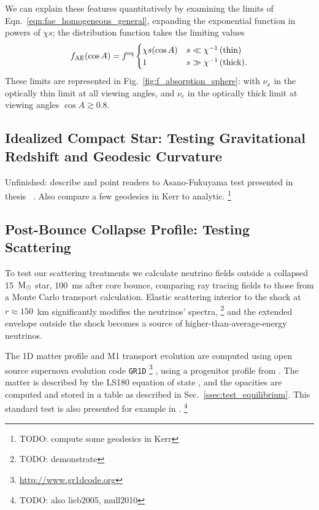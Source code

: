 \documentclass[aps,floatfix,prd,superscriptaddress,twocolumn]{revtex4-1}
\begin{document}
We can explain these features quantitatively by examining the limits
of Eqn.~\ref{eqn:fae_homogeneous_general}, expanding the exponential function
in powers of $\chi s$; the distribution function takes the limiting values
\begin{equation}
  \label{eqn:fae_homogeneous_limits}
  f_{\rm AE}(\cos A) = f^{\rm eq}
  \begin{cases}
    \chi s(\cos A) & s \ll \chi^{-1}\,\textrm{(thin)}\\
    1                  & s \gg \chi^{-1}\,\textrm{(thick)}.
  \end{cases}
\end{equation}
These limits are represented in Fig.~\ref{fig:f_absorption_sphere}:
with $\nu_x$ in the optically thin limit at all viewing angles,
and $\nu_e$ in the optically thick limit at viewing angles
$\cos A \gtrsim 0.8$.

\subsection{Idealized Compact Star:
  Testing Gravitational Redshift and Geodesic Curvature}
\label{ssec:test_gravity}
Unfinished: describe and point readers to Asano-Fukuyama test presented
in thesis ~\cite[Sec.~4.3.3]{deat2015-thesis}.
Also compare a few geodesics in Kerr to analytic.
\footnote{TODO: compute some geodesics in Kerr}

\subsection{Post-Bounce Collapse Profile:
  Testing Scattering}
\label{ssec:test_collapse}
To test our scattering treatments we calculate neutrino fields outside a
collapsed 15~${\rm M}_\odot$ star, 100~ms after core bounce,
comparing ray tracing fields to those from a Monte Carlo transport calculation.
Elastic scattering interior to the shock at $r\approx150$~km
significantly modifies the neutrinos' spectra,
\footnote{TODO: demonstrate}
and the extended envelope outside the shock becomes a source of
higher-than-average-energy neutrinos.

The 1D matter profile and M1 transport evolution are computed using
open source supernova evolution code \lstinline{GR1D}
\footnote{\url{http://www.gr1dcode.org}}
\cite{ocon2010-gr1d, ocon2015-gr1d_with_nu},
using a progenitor profile from \cite{woos1995-sn_progenitors}.
The matter is described by the LS180 equation of state \cite{latt1991-nuc_eos},
and the opacities are computed and stored in a table
as described in Sec.~\ref{ssec:test_equilibrium}.
This standard test is also presented for example in
\cite{ocon2015-gr1d_with_nu,fouc2015-m1_nsbh,abdi2012-monte_carlo}.
\footnote{TODO: also lieb2005, mull2010}
\end{document}

